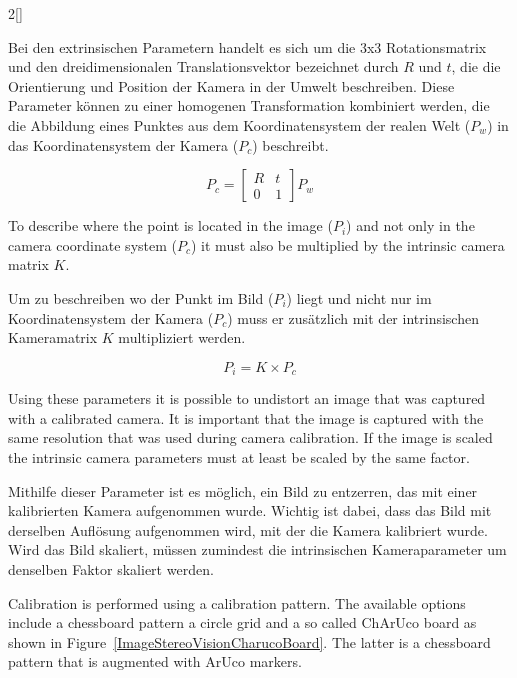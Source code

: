 \begin{paracol}{2}[]
\colger

Bei den extrinsischen Parametern handelt es sich um die 3x3 Rotationsmatrix und den dreidimensionalen Translationsvektor bezeichnet durch $R$ und $t$, die die Orientierung und Position der Kamera in der Umwelt beschreiben. Diese Parameter können zu einer homogenen Transformation kombiniert werden, die die Abbildung eines Punktes aus dem Koordinatensystem der realen Welt ($P_w$) in das Koordinatensystem der Kamera ($P_c$) beschreibt.

\colende

$$ P_c = \begin{bmatrix}
	R & t \\
	0 & 1
\end{bmatrix} P_w $$

\colstart

To describe where the point is located in the image ($P_i$) and not only in the camera coordinate system ($P_c$) it must also be multiplied by the intrinsic camera matrix $K$.

\colger

Um zu beschreiben wo der Punkt im Bild ($P_i$) liegt und nicht nur im Koordinatensystem der Kamera ($P_c$) muss er zusätzlich mit der intrinsischen Kameramatrix $K$ multipliziert werden.

\colende

$$ P_i = K \times P_c $$

\colstart

Using these parameters it is possible to undistort an image that was captured with a calibrated camera. It is important that the image is captured with the same resolution that was used during camera calibration. If the image is scaled the intrinsic camera parameters must at least be scaled by the same factor.

\colger

Mithilfe dieser Parameter ist es möglich, ein Bild zu entzerren, das mit einer kalibrierten Kamera aufgenommen wurde. Wichtig ist dabei, dass das Bild mit derselben Auflösung aufgenommen wird, mit der die Kamera kalibriert wurde. Wird das Bild skaliert, müssen zumindest die intrinsischen Kameraparameter um denselben Faktor skaliert werden.

\coleng

Calibration is performed using a calibration pattern. The available options include a chessboard pattern a circle grid and a so called ChArUco board as shown in Figure~\ref{ImageStereoVisionCharucoBoard}. The latter is a chessboard pattern that is augmented with ArUco markers.


\end{paracol}
